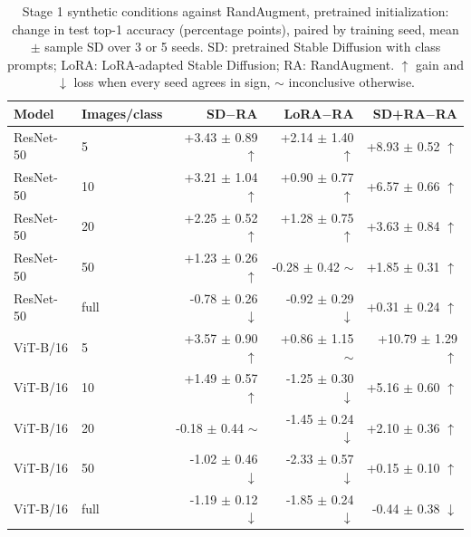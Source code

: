 \begin{table}[H]
\centering
\caption{Stage 1 synthetic conditions against RandAugment, pretrained initialization: change in test top-1 accuracy (percentage points), paired by training seed, mean $\pm$ sample SD over 3 or 5 seeds. SD: pretrained Stable Diffusion with class prompts; LoRA: LoRA-adapted Stable Diffusion; RA: RandAugment. $\uparrow$ gain and $\downarrow$ loss when every seed agrees in sign, $\sim$ inconclusive otherwise.}
\label{tab:stage1-pretrained-accuracy-vs-randaugment-test}
\begin{tabular}{llrrr}
\toprule
Model & Images/class & SD$-$RA & LoRA$-$RA & SD+RA$-$RA \\
\midrule
ResNet-50 & 5 & +3.43 $\pm$ 0.89 $\uparrow$ & +2.14 $\pm$ 1.40 $\uparrow$ & +8.93 $\pm$ 0.52 $\uparrow$ \\
ResNet-50 & 10 & +3.21 $\pm$ 1.04 $\uparrow$ & +0.90 $\pm$ 0.77 $\uparrow$ & +6.57 $\pm$ 0.66 $\uparrow$ \\
ResNet-50 & 20 & +2.25 $\pm$ 0.52 $\uparrow$ & +1.28 $\pm$ 0.75 $\uparrow$ & +3.63 $\pm$ 0.84 $\uparrow$ \\
ResNet-50 & 50 & +1.23 $\pm$ 0.26 $\uparrow$ & -0.28 $\pm$ 0.42 $\sim$ & +1.85 $\pm$ 0.31 $\uparrow$ \\
ResNet-50 & full & -0.78 $\pm$ 0.26 $\downarrow$ & -0.92 $\pm$ 0.29 $\downarrow$ & +0.31 $\pm$ 0.24 $\uparrow$ \\
\midrule
ViT-B/16 & 5 & +3.57 $\pm$ 0.90 $\uparrow$ & +0.86 $\pm$ 1.15 $\sim$ & +10.79 $\pm$ 1.29 $\uparrow$ \\
ViT-B/16 & 10 & +1.49 $\pm$ 0.57 $\uparrow$ & -1.25 $\pm$ 0.30 $\downarrow$ & +5.16 $\pm$ 0.60 $\uparrow$ \\
ViT-B/16 & 20 & -0.18 $\pm$ 0.44 $\sim$ & -1.45 $\pm$ 0.24 $\downarrow$ & +2.10 $\pm$ 0.36 $\uparrow$ \\
ViT-B/16 & 50 & -1.02 $\pm$ 0.46 $\downarrow$ & -2.33 $\pm$ 0.57 $\downarrow$ & +0.15 $\pm$ 0.10 $\uparrow$ \\
ViT-B/16 & full & -1.19 $\pm$ 0.12 $\downarrow$ & -1.85 $\pm$ 0.24 $\downarrow$ & -0.44 $\pm$ 0.38 $\downarrow$ \\
\bottomrule
\end{tabular}
\end{table}
